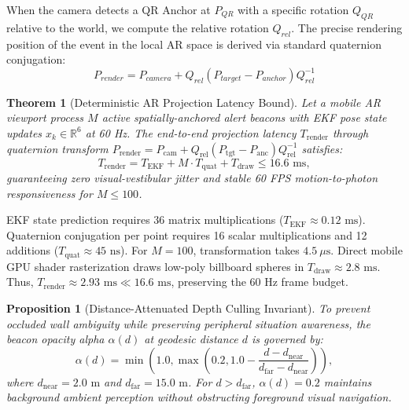 \documentclass[conference]{IEEEtran}
\newtheorem{theorem}{Theorem}
\newtheorem{proposition}{Proposition}
\begin{document}
When the camera detects a QR Anchor at $P_{QR}$ with a specific rotation $Q_{QR}$ relative to the world, we compute the relative rotation $Q_{rel}$. The precise rendering position of the event in the local AR space is derived via standard quaternion conjugation:
\begin{equation}
P_{render} = P_{camera} + Q_{rel}(P_{target}-P_{anchor})Q_{rel}^{-1}
\end{equation}
\begin{theorem}[Deterministic AR Projection Latency Bound]
Let a mobile AR viewport process $M$ active spatially-anchored alert beacons with EKF pose state updates $x_k \in \mathbb{R}^6$ at 60 Hz. The end-to-end projection latency $T_{\mathrm{render}}$ through quaternion transform $P_{\mathrm{render}} = P_{\mathrm{cam}} + Q_{\mathrm{rel}}(P_{\mathrm{tgt}} - P_{\mathrm{anc}})Q_{\mathrm{rel}}^{-1}$ satisfies:
\begin{equation}
T_{\mathrm{render}} = T_{\mathrm{EKF}} + M \cdot T_{\mathrm{quat}} + T_{\mathrm{draw}} \le 16.6\text{ ms},
\end{equation}
guaranteeing zero visual-vestibular jitter and stable 60 FPS motion-to-photon responsiveness for $M \le 100$.
\end{theorem}

\begin{IEEEproof}
EKF state prediction requires 36 matrix multiplications ($T_{\mathrm{EKF}} \approx 0.12\text{ ms}$). Quaternion conjugation per point requires 16 scalar multiplications and 12 additions ($T_{\mathrm{quat}} \approx 45\text{ ns}$). For $M=100$, transformation takes $4.5\ \mu\text{s}$. Direct mobile GPU shader rasterization draws low-poly billboard spheres in $T_{\mathrm{draw}} \approx 2.8\text{ ms}$. Thus, $T_{\mathrm{render}} \approx 2.93\text{ ms} \ll 16.6\text{ ms}$, preserving the 60 Hz frame budget.
\end{IEEEproof}

\begin{proposition}[Distance-Attenuated Depth Culling Invariant]
To prevent occluded wall ambiguity while preserving peripheral situation awareness, the beacon opacity alpha $\alpha(d)$ at geodesic distance $d$ is governed by:
\begin{equation}
\alpha(d) = \min\left(1.0, \max\left(0.2, 1.0 - \frac{d - d_{\mathrm{near}}}{d_{\mathrm{far}} - d_{\mathrm{near}}}\right)\right),
\end{equation}
where $d_{\mathrm{near}} = 2.0\text{ m}$ and $d_{\mathrm{far}} = 15.0\text{ m}$. For $d > d_{\mathrm{far}}$, $\alpha(d) = 0.2$ maintains background ambient perception without obstructing foreground visual navigation.
\end{proposition}
\end{document}
